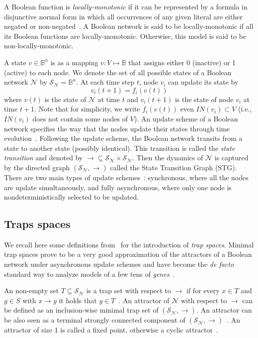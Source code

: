 \documentclass[preprint,12pt]{elsarticle}
\begin{document}
A Boolean function is \emph{locally-monotonic} if it can be represented by a formula in disjunctive normal form in which all occurrences of any given literal are either negated or non-negated~\cite{Paulev2020}.
A Boolean network is said to be locally-monotonic if all its Boolean functions are locally-monotonic. 
Otherwise, this model is said to be non-locally-monotonic.

A state \(v \in \mathbb{B}^{n}\) is as a mapping \(v \colon V \mapsto \mathbb{B}\) that assigns either 0 (inactive) or 1 (active) to each node.
We denote the set of all possible states of a Boolean network \(\mathcal{N}\) by \(\mathcal{S}_{\mathcal{N}} = \mathbb{B}^n\).
At each time step \(t\), node \(v_i\) can update its state by
\[v_i(t + 1) = f_i(v(t))\]
where \(v(t)\) is the state of \(\mathcal{N}\) at time \(t\) and \(v_i(t + 1)\) is the state of node \(v_i\) at time \(t + 1\).
Note that for simplicity, we write \(f_i(v(t))\) even \(IN(v_i) \subset V\) (i.e., \(IN(v_i)\) does not contain some nodes of \(V\)).
An update scheme of a Boolean network specifies the way that the nodes update their states through time evolution~\cite{thomas1991regulatory}. 
Following the update scheme, the Boolean network transits from a state to another state (possibly identical).
This transition is called the \emph{state transition} and denoted by \(\rightarrow \subseteq \mathcal{S}_{\mathcal{N}} \times \mathcal{S}_{\mathcal{N}}\).
Then the dynamics of \(\mathcal{N}\) is captured by the directed graph \((\mathcal{S}_{\mathcal{N}}, \rightarrow)\) called the State Transition Graph (STG).
There are two main types of update schemes~\cite{thomas1991regulatory}: synchronous, where all the nodes are update simultaneously, and fully asynchronous, where only one node is nondeterministically selected to be updated.

\subsection{Traps spaces}

We recall here some definitions from~\cite{klarner2015computing} for the introduction of \emph{trap spaces}.
Minimal trap spaces prove to be a very good approximation of the attractors of a Boolean network under asynchronous update schemes and have become the \emph{de facto} standard way to analyze models of a few tens of \emph{genes}~\cite{klarner2017pyboolnet,cifuentes2020control}.

An non-empty set \(T \subseteq \mathcal{S}_{\mathcal{N}}\) is a trap set with respect to \(\rightarrow\) if for every \(x \in T\) and \(y \in S\) with \(x \rightarrow y\) it holds that \(y \in T\)~\cite{klarner2015computing}.
An attractor of \(\mathcal{N}\) with respect to \(\rightarrow\) can be defined as an inclusion-wise minimal trap set of \((\mathcal{S}_{\mathcal{N}}, \rightarrow)\).
An attractor can be also seen as a terminal strongly connected component of \((\mathcal{S}_{\mathcal{N}}, \rightarrow)\)~\cite{chatain2014characterization}.
An attractor of size 1 is called a fixed point, otherwise a cyclic attractor~\cite{klarner2015computing}.
\end{document}
